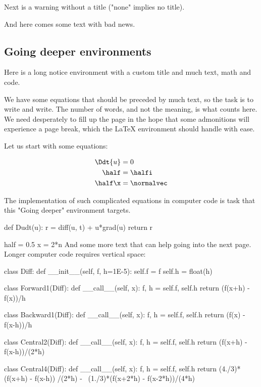 \documentclass[%
oneside,                 %
final,                   %
10pt]{article}
\newenvironment{notice_mdfboxadmon}[1][]{
\begin{notice_mdfboxmdframed}[frametitle=#1]
}
{
\end{notice_mdfboxmdframed}
}
\newenvironment{warning_mdfboxadmon}[1][]{
\begin{warning_mdfboxmdframed}[frametitle=#1]
}
{
\end{warning_mdfboxmdframed}
}
\begin{document}
Next is a warning without a title ("none" implies no title).


\begin{warning_mdfboxadmon}[]
And here comes some text with bad news.
\end{warning_mdfboxadmon} %



\subsection{Going deeper environments}

Here is a long notice environment with a custom title and much
text, math and code.


\begin{notice_mdfboxadmon}
We have some equations that should be preceded by much text, so the
task is to write and write. The number of words, and not the
meaning, is what counts here. We need desperately to fill up the
page in the hope that some admonitions will experience a page break,
which the {\LaTeX} environment should handle with ease.

Let us start with some equations:

\begin{align*}
\Ddt{u} &= 0
\\
\half &= \halfi\\
\half\x &= \normalvec
\end{align*}

The implementation of such complicated equations in computer
code is task that this "Going deeper" environment targets.

def Dudt(u):
    r = diff(u, t) + u*grad(u)
    return r

half = 0.5
x = 2*n
And some more text that can help going into the next page.
Longer computer code requires vertical space:

class Diff:
    def __init__(self, f, h=1E-5):
        self.f = f
        self.h = float(h)

class Forward1(Diff):
    def __call__(self, x):
        f, h = self.f, self.h
        return (f(x+h) - f(x))/h

class Backward1(Diff):
    def __call__(self, x):
        f, h = self.f, self.h
        return (f(x) - f(x-h))/h

class Central2(Diff):
    def __call__(self, x):
        f, h = self.f, self.h
        return (f(x+h) - f(x-h))/(2*h)

class Central4(Diff):
    def __call__(self, x):
        f, h = self.f, self.h
        return (4./3)*(f(x+h)   - f(x-h))  /(2*h) - \
               (1./3)*(f(x+2*h) - f(x-2*h))/(4*h)


\end{notice_mdfboxadmon}
\end{document}
